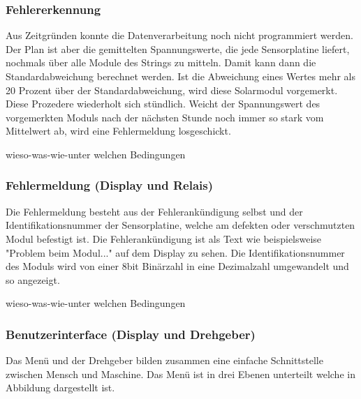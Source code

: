 \subsubsection{Fehlererkennung}
Aus Zeitgründen konnte die Datenverarbeitung noch nicht programmiert werden. Der Plan ist aber die gemittelten Spannungswerte, die jede Sensorplatine liefert, nochmals über alle Module des Strings zu mitteln. Damit kann dann die Standardabweichung berechnet werden. Ist die Abweichung eines Wertes mehr als 20 Prozent über der Standardabweichung, wird diese Solarmodul vorgemerkt. Diese Prozedere wiederholt sich stündlich. Weicht der Spannungswert des vorgemerkten Moduls nach der nächsten Stunde noch immer so stark vom Mittelwert ab, wird eine Fehlermeldung losgeschickt.

wieso-was-wie-unter welchen Bedingungen
\subsubsection{Fehlermeldung (Display und Relais)}
Die Fehlermeldung besteht aus der Fehlerankündigung selbst und der Identifikationsnummer der Sensorplatine, welche am defekten oder verschmutzten Modul befestigt ist. Die Fehlerankündigung ist als Text wie beispielsweise "Problem beim Modul..." auf dem Display zu sehen. Die Identifikationsnummer des Moduls wird von einer 8bit Binärzahl in eine Dezimalzahl umgewandelt und so angezeigt.

wieso-was-wie-unter welchen Bedingungen
\subsubsection{Benutzerinterface (Display und Drehgeber)}

Das Menü und der Drehgeber bilden zusammen eine einfache Schnittstelle zwischen Mensch und Maschine. Das Menü ist in drei Ebenen unterteilt welche in Abbildung  dargestellt ist.


